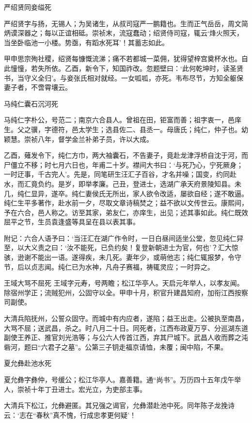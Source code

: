 \documentclass[]{article}
\begin{document}
严绍贤同妾缢死

严绍贤字与扬，无锡人；为吴诸生，从叔司寇严一鹏籍也。生而正气岳岳，周文简炳谟深器之；每以正谊相砥。崇祯末，流寇蠢动；绍贤侍司寇，辄云`烽火照天，当坐卧临池一小楼。势亟，有蹈水死耳'！其蓄志如此。

甲申思宗殉社稷，绍贤每慷慨流涕；痛不若都城一菜佣，犹得望梓宫奠杯水也。自此憧憧，若失所依。乙酉，新令下，知国祚改。忽题壁曰：`此何乾坤时，读圣贤书，当守义全归'。与妾张氏相对就经。一女呱呱，亦死。韦布尽节，方知全躯保妻子者，不啻霄壤云。

马纯仁囊石沉河死

马纯仁字朴公，号范二；南京六合县人。曾祖在田，钜富而善；祖字衷一，邑庠生。父之骥，字德符，邑太学生；选县佐二、县丞一。母唐氏；纯仁，仲子也。幼颖慧。崇祯八年，督学金兰补弟子员，许以大成。

乙酉，薙发令下，纯仁方巾，两大袖囊石，不告妻子，竟赴龙津浮桥自沈于河，而尸僵立不移；时七月六日也，年甫二十岁。襟间大书曰：`与死乃心，宁死厥身；一时迂事，千古完人'。先是，同笔研生汪汇子百谷，才名并噪；国变，约同赴水，而汇竟负约。是岁，即举孝廉。己丑，登进士，选湖广承天府景陵知县。未几，纯仁显异，遂卒。纯仁妻侯氏无所出，家人欲令改适，屡欲自经；遂不敢逼。纯仁生平多著作，赴水前一夕，尽取文章诗稿焚之；益不欲以文传世云。康熙间，予在六合，邑人称之。访至其家，弟友仁，亦庠生，出见；述其事如此。纯仁既效屈平之节，生员袁逢盛等具呈在县以表其事。

附记：六合人语予曰：`当汪汇在湖广作令时，一日白昼间适坐公堂，忽见纯仁舁至，以大义责之曰：`汝不能死，已负约矣！复登新朝进士为官，何也'？汇大惊骇，逊谢不能出一语。遂得疾，未几死。妻年少，或萌他志；纯仁辄报梦，令守节，后以贞志闻。纯仁已为水神，凡舟子赛福，祷辄灵应；一时异之。

王域大骂不屈死
王域字元寿，号两瞻；松江华亭人。天启元年举人，以孝友闻。除宿州学正；流贼犯州，公固守以全。甲申十月，积官升建昌知府，加衔江西按察司副使。

大清兵陷抚州，公誓众固守。而城中有内应者，遂陷；益王出走。公被执至南昌，大骂不屈；送武昌，杀之。时八月二十日。同死者，江西布政夏万亨、分巡湖东道副使王养正、推官刘光浩等；与公六人传首江西，弃其尸城下。武昌人收而葬之沌砦河，题曰``六君子之墓''。公第三子钥走福京请恤，未覆；闽中陷，不果。

夏允彝赴池水死

夏允彝字彝仲，号缓公；松江华亭人。嘉善籍。通``尚书''。万历四十五年戊午举人，崇祯十年丁丑进士。宏光立，为吏部主事。

大清兵下松江，允彝避匿。其兄强之谒官，允彝潜赴池中死。同年陈子龙挽诗云：`志在``春秋''真不愧，行成忠孝更何疑'！
\end{document}
